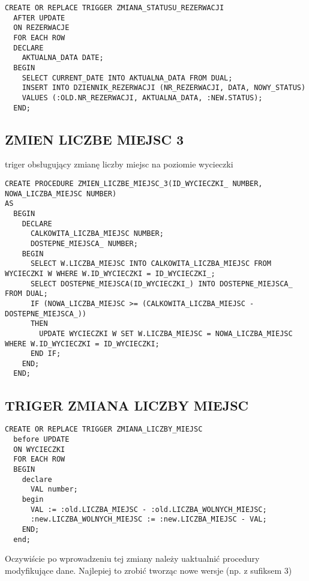 \begin{verbatim}
CREATE OR REPLACE TRIGGER ZMIANA_STATUSU_REZERWACJI
  AFTER UPDATE
  ON REZERWACJE
  FOR EACH ROW
  DECLARE
    AKTUALNA_DATA DATE;
  BEGIN
    SELECT CURRENT_DATE INTO AKTUALNA_DATA FROM DUAL;
    INSERT INTO DZIENNIK_REZERWACJI (NR_REZERWACJI, DATA, NOWY_STATUS)
    VALUES (:OLD.NR_REZERWACJI, AKTUALNA_DATA, :NEW.STATUS);
  END;
\end{verbatim}

\subsection{ZMIEN LICZBE MIEJSC 3}
triger obsługujący zmianę liczby miejsc na poziomie wycieczki
\begin{verbatim}
CREATE PROCEDURE ZMIEN_LICZBE_MIEJSC_3(ID_WYCIECZKI_ NUMBER, NOWA_LICZBA_MIEJSC NUMBER)
AS
  BEGIN
    DECLARE
      CALKOWITA_LICZBA_MIEJSC NUMBER;
      DOSTEPNE_MIEJSCA_ NUMBER;
    BEGIN
      SELECT W.LICZBA_MIEJSC INTO CALKOWITA_LICZBA_MIEJSC FROM WYCIECZKI W WHERE W.ID_WYCIECZKI = ID_WYCIECZKI_;
      SELECT DOSTEPNE_MIEJSCA(ID_WYCIECZKI_) INTO DOSTEPNE_MIEJSCA_ FROM DUAL;
      IF (NOWA_LICZBA_MIEJSC >= (CALKOWITA_LICZBA_MIEJSC - DOSTEPNE_MIEJSCA_))
      THEN
        UPDATE WYCIECZKI W SET W.LICZBA_MIEJSC = NOWA_LICZBA_MIEJSC WHERE W.ID_WYCIECZKI = ID_WYCIECZKI;
      END IF;
    END;
  END;
\end{verbatim}

\subsection{TRIGER ZMIANA LICZBY MIEJSC}
\begin{verbatim}
CREATE OR REPLACE TRIGGER ZMIANA_LICZBY_MIEJSC
  before UPDATE
  ON WYCIECZKI
  FOR EACH ROW
  BEGIN
    declare
      VAL number;
    begin
      VAL := :old.LICZBA_MIEJSC - :old.LICZBA_WOLNYCH_MIEJSC;
      :new.LICZBA_WOLNYCH_MIEJSC := :new.LICZBA_MIEJSC - VAL;
    END;
  end;
\end{verbatim} 



Oczywiście po wprowadzeniu tej zmiany należy uaktualnić procedury modyfikujące dane.
Najlepiej to zrobić tworząc nowe wersje (np. z sufiksem 3)

